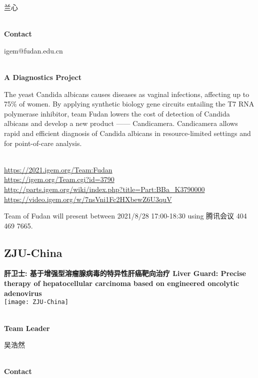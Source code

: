   兰心


\textbf{\\Contact}

  igem@fudan.edu.cn


\textbf{\\A Diagnostics Project\\}\begin{spacing}{1.5}

The yeast Candida albicans causes diseases as vaginal infections, affecting up to 75\% of women. By applying synthetic biology gene circuits entailing the T7 RNA polymerase inhibitor, team Fudan lowers the cost of detection of Candida albicans and develop a new product —— Candicamera. Candicamera allows rapid and efficient diagnosis of Candida albicans in resource-limited settings and for point-of-care analysis.\end{spacing}
\\

\url{https://2021.igem.org/Team:Fudan }\\
\url{https://igem.org/Team.cgi?id=3790 }\\
\url{http://parts.igem.org/wiki/index.php?title=Part:BBa_K3790000 }\\
\url{https://video.igem.org/w/7nsVni1Fc2HXbewZ6U3quV }\\

\vfill{}









Team of Fudan will present between        2021/8/28 17:00-18:30 using 腾讯会议 404 469 7665.
\newpage


\subsection{\textcolor{Blu}{ ZJU-China } }
\vspace{5mm}
\begin{center}
\large{
  \textbf{ 肝卫士: 基于增强型溶瘤腺病毒的特异性肝癌靶向治疗 Liver Guard: Precise therapy of hepatocellular carcinoma based on engineered oncolytic adenovirus }\\
  \texttt{[image: ZJU-China]}
}
\end{center}
\textbf{\\Team Leader}

  吴浩然


\textbf{\\Contact}

